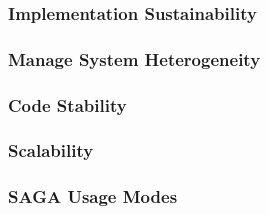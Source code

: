 \documentclass[a4paper,12pt]{article}
\begin{document}
   \subsubsection*{Implementation Sustainability}
   \label{ssec:obj.sustain}

    
    


   \subsubsection*{Manage System Heterogeneity}
   \label{ssec:obj.system}
    

   \subsubsection*{Code Stability}
   \label{ssec:obj.stable}
    

   \subsubsection*{Scalability}
   \label{ssec:obj.scalability}
    

   \subsubsection*{SAGA Usage Modes}
   \label{ssec:obj.usage}
    
\end{document}
